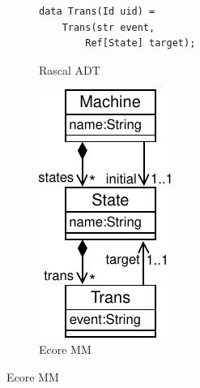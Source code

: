 \begin{figure}[bt]
\begin{subfigure}[b]{.3\columnwidth}
\begin{lstlisting}[label=lst:fsm-adt, language=Rascal, numbers=none, xleftmargin=0pt, tabsize=1]
data Trans(Id uid) =
	Trans(str event,
		Ref[State] target);
		\end{lstlisting}
		\caption{Rascal ADT}
	\end{subfigure}
	\vrule
	\enskip
	\begin{subfigure}[b]{.28\columnwidth}
		\includegraphics[width=\textwidth]{figures/fsm-mm}
		\caption{Ecore MM}
	\end{subfigure}

\end{figure}
